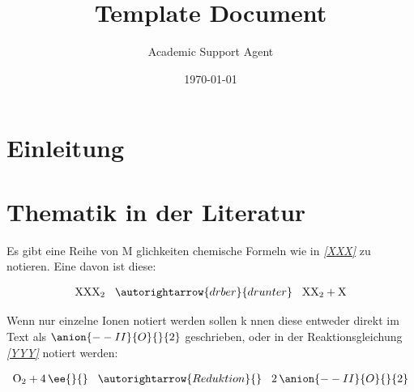 \documentclass{article}
\title{Template Document}
\author{Academic Support Agent}
\date{\today}
\begin{document}
\maketitle

 
\section{Einleitung} %
\label{sec:Einleitung} %
\lipsum[2]			%

\section{Thematik in der Literatur}
\lipsum[30]				%

Es gibt eine Reihe von M glichkeiten chemische Formeln wie in \textsl{\ref{XXX}} zu notieren. Eine davon ist diese:

\begin{equation}					%
\begin{aligned}						%
\label{XXX}							%
\textnormal{XXX}_2 \hspace{0.3cm}\autorightarrow{dr ber}{drunter}\hspace{0.3cm} \textnormal{XX}_2 + \textnormal{X}
\end{aligned}
\end{equation}
\vspace{0.2cm}

Wenn nur einzelne Ionen notiert werden sollen k nnen diese entweder direkt im Text als $\anion{--II}{O}{}{2}$ geschrieben, oder in der Reaktionsgleichung \textsl{\ref{YYY}} notiert werden:

\begin{equation}					%
\begin{aligned}						%
\label{YYY}							%
\textnormal{O}_2 + 4\, \ee{}{} \hspace{0.3cm}\autorightarrow{Reduktion}{}\hspace{0.3cm} 2\,\anion{--II}{O}{}{2} 
\end{aligned}
\end{equation}
\vspace{0.2cm}
\end{document}

